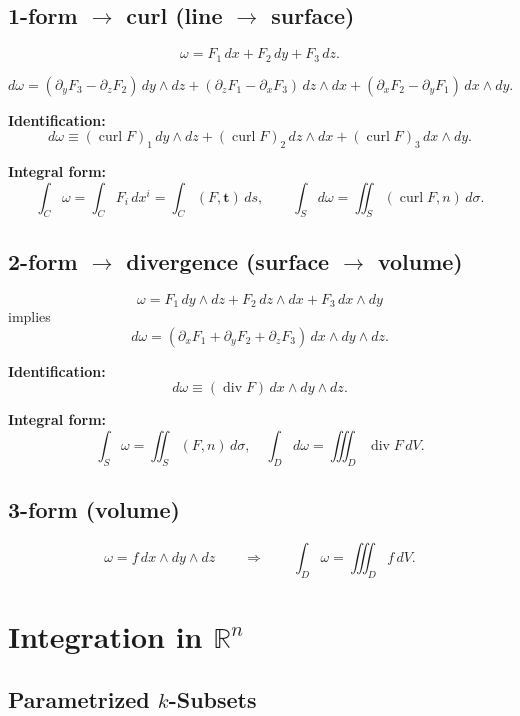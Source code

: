 \documentclass[11pt]{report}
\theoremstyle{definition}
\theoremstyle{plain}
\theoremstyle{remark}
\newcommand{\R}{\mathbb{R}}
\newcommand{\ip}[2]{\left(#1,#2\right)}
\newcommand{\divergence}{\operatorname{div}}
\newcommand{\curl}{\operatorname{curl}}
\newcommand{\ut}{\mathbf{t}}
\begin{document}
\subsection{1-form \texorpdfstring{$\to$}{->} curl (line \texorpdfstring{$\to$}{->} surface)}

\[
\omega = F_1\,dx + F_2\,dy + F_3\,dz.
\]

\[
d\omega =
(\partial_y F_3 - \partial_z F_2)\,dy\wedge dz
+
(\partial_z F_1 - \partial_x F_3)\,dz\wedge dx
+
(\partial_x F_2 - \partial_y F_1)\,dx\wedge dy.
\]

\textbf{Identification:}
\[
d\omega \equiv (\curl F)_1\,dy\wedge dz + (\curl F)_2\,dz\wedge dx + (\curl F)_3\,dx\wedge dy.
\]

\textbf{Integral form:}
\[
\int_C \omega
=
\int_C F_i\,dx^i
=
\int_C \ip{F}{\ut}\,ds,
\qquad
\int_S d\omega
=
\iint_S \ip{\curl F}{n}\,d\sigma.
\]

\subsection{2-form \texorpdfstring{$\to$}{->} divergence (surface \texorpdfstring{$\to$}{->} volume)}

\[
\omega = F_1\,dy\wedge dz + F_2\,dz\wedge dx + F_3\,dx\wedge dy
\]
implies
\[
d\omega =
(\partial_x F_1 + \partial_y F_2 + \partial_z F_3)\,dx\wedge dy\wedge dz.
\]

\textbf{Identification:}
\[
d\omega \equiv (\divergence F)\,dx\wedge dy\wedge dz.
\]

\textbf{Integral form:}
\[
\int_S \omega
=
\iint_S \ip{F}{n}\,d\sigma,
\quad 
\int_D d\omega
=
\iiint_D \divergence F\,dV.
\]

\subsection{3-form (volume)}

\[
\omega = f\,dx\wedge dy\wedge dz
\qquad \Rightarrow \qquad
\int_D \omega = \iiint_D f\,dV.
\]

\section{Integration in \texorpdfstring{$\R^n$}{Rn}}

\subsection{Parametrized \texorpdfstring{$k$}{k}-Subsets}
\end{document}
